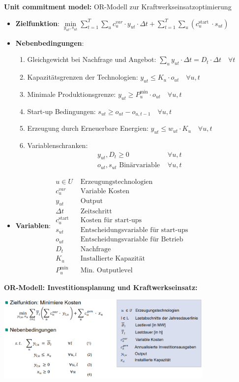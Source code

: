 \textbf{Unit commitment model:} OR-Modell zur Kraftwerkseinsatzoptimierung
\begin{itemize}
	\item \textbf{Zielfunktion}: $
	\min\limits_{y_{u t}, s_{u t}} \sum\limits_{t=1}^{T} \sum\limits_{u} c_{u}^{v a r} \cdot y_{u t} \cdot \Delta t+\sum\limits_{t=1}^{T} \sum\limits_{u}\left(c_{u}^{\text {start }} \cdot s_{u t}\right)
	$
	\item \textbf{Nebenbedingungen}:
	\begin{enumerate}
		\item Gleichgewicht bei Nachfrage und Angebot: $\sum\limits_{u} y_{u t} \cdot \Delta t=D_{t} \cdot \Delta t \quad \forall t$
		\item Kapazitätsgrenzen der Technologien: $y_{u t} \leq K_{u} \cdot o_{u t} \quad \forall u, t$
		\item Minimale Produktionsgrenze: $y_{u t} \geq P_{u}^{\min } \cdot o_{u t} \quad \forall u, t$
		\item Start-up Bedingungen: $s_{u t} \geq o_{u t}-o_{u, t-1} \quad \forall u, t$
		\item Erzeugung durch Erneuerbare Energien: $y_{u t} \leq w_{u t} \cdot K_{u} \quad \forall u, t$
		\item Variablenschranken: $$
		\begin{array}{ll}
			y_{u t}, D_{t} \geq 0 & \forall u, t \\
			o_{u t}, s_{u t} \text { Binärvariable } & \forall u, t
		\end{array}
		$$
	\end{enumerate}
	\item \textbf{Variablen}:\qquad
	$\begin{array}{ll}u \in U & \text { Erzeugungstechnologien } \\ c_{u}^{v a r} & \text { Variable Kosten } \\ y_{u t} & \text { Output } \\ \Delta t & \text { Zeitschritt } \\ c_{u}^{\text {start }} & \text { Kosten für start-ups } \\ s_{u t} & \text { Entscheidungsvariable für start-ups } \\ o_{u t} & \text { Entscheidungsvariable für Betrieb } \\ D_{t} & \text { Nachfrage } \\ K_{u} & \text { Installierte Kapazität } \\ P_{u}^{\text {min }} & \text { Min. Outputlevel }\end{array}$
\end{itemize}
\bigskip
\textbf{OR-Modell: Investitionsplanung und Kraftwerkseinsatz:}
\begin{center}
	\includegraphics[width=0.8\textwidth]{images/or.png}
\end{center}